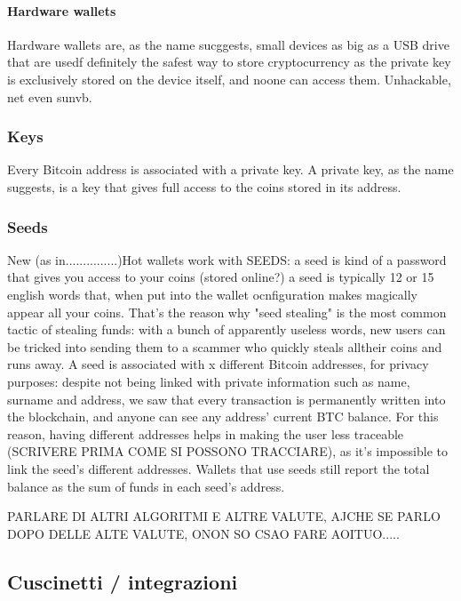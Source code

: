 \documentclass {article}
\begin{document}
\paragraph {Hardware wallets}


Hardware wallets are, as the name sucggests, small devices as big as a USB drive that are usedf
definitely the safest way to store cryptocurrency as the private key is exclusively stored on the device itself, and noone can access them. Unhackable, net even sunvb.


\subsubsection {Keys}


Every Bitcoin address is associated with a private key.
A private key, as the name suggests, is a key that gives full access to the coins stored in its address.


\subsubsection {Seeds}


New (as in...............)Hot wallets work with SEEDS: a seed is kind of a password that gives you access to your coins (stored online?) a seed is typically 12 or 15 english words that, when put into the wallet ocnfiguration makes magically appear all your coins.
That's the reason why "seed stealing" is the most common tactic of stealing funds: with a bunch of apparently useless words, new users can be tricked into sending them to a scammer who quickly steals alltheir coins and runs away.
A seed is associated with x different Bitcoin addresses, for privacy purposes: despite not being linked with private information such as name, surname and address, we saw that every transaction is permanently written into the blockchain, and anyone can see any address' current BTC balance.
For this reason, having different addresses helps in making the user less traceable (SCRIVERE PRIMA COME SI POSSONO TRACCIARE), as it's impossible to link the seed's different addresses.
Wallets that use seeds still report the total balance as the sum of funds in each seed's address.


PARLARE DI ALTRI ALGORITMI E ALTRE VALUTE, AJCHE SE PARLO DOPO DELLE ALTE VALUTE, ONON SO CSAO FARE AOITUO.....


\subsection {Cuscinetti / integrazioni}
\end{document}
